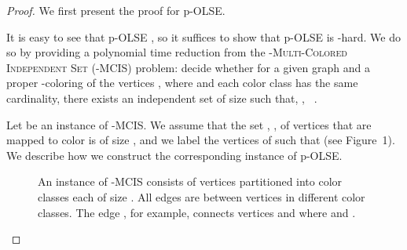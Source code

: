 \documentclass[11pt]{article}
\begin{document}
\begin{proof}
We first present the proof for p-OLSE.

It is easy to see that p-\textsc{OLSE} , so it suffices to show that
p-\textsc{OLSE} is -hard.  We do so by providing a polynomial time
reduction from the \textsc{-Multi-Colored Independent Set (-MCIS)} problem:
decide whether for a given graph  and a proper -coloring of the
vertices , where  and each color class has the same cardinality, there exists an independent
set  of size  such that, , ~\cite{Hartung2013}.

Let  be an instance of \textsc{-MCIS}.
We assume that the set , , of vertices that are mapped to color 
is of size , and we label the vertices of   such that
 (see Figure~1). We
describe how we construct the corresponding instance  of p-\textsc{OLSE}.

\begin{figure}
\label{fi:kMCIS}
\begin{center}
\end{center}
\caption{An instance of \textsc{-MCIS} consists of  vertices partitioned
into  color classes  each of size . All edges are
between vertices in different color classes. The edge , for
example, connects vertices  and  where  and
.}
\end{figure}


\end{proof}
\end{document}
